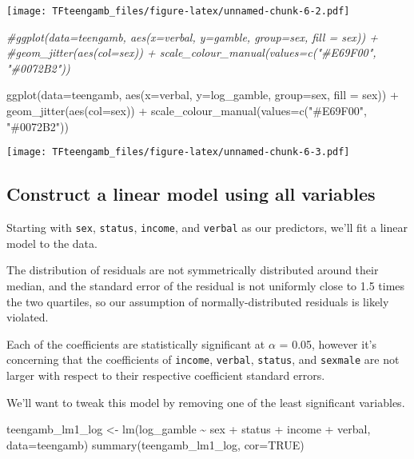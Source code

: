 \documentclass[
]{article}
\newenvironment{Shaded}{\begin{snugshade}}{\end{snugshade}}
\newcommand{\AttributeTok}[1]{\textcolor[rgb]{0.77,0.63,0.00}{#1}}
\newcommand{\CommentTok}[1]{\textcolor[rgb]{0.56,0.35,0.01}{\textit{#1}}}
\newcommand{\ConstantTok}[1]{\textcolor[rgb]{0.00,0.00,0.00}{#1}}
\newcommand{\FunctionTok}[1]{\textcolor[rgb]{0.00,0.00,0.00}{#1}}
\newcommand{\NormalTok}[1]{#1}
\newcommand{\OtherTok}[1]{\textcolor[rgb]{0.56,0.35,0.01}{#1}}
\newcommand{\SpecialCharTok}[1]{\textcolor[rgb]{0.00,0.00,0.00}{#1}}
\newcommand{\StringTok}[1]{\textcolor[rgb]{0.31,0.60,0.02}{#1}}
\begin{document}
\texttt{[image: TFteengamb\_files/figure-latex/unnamed-chunk-6-2.pdf]}

\begin{Shaded}
\begin{Highlighting}[]
\CommentTok{\#ggplot(data=teengamb, aes(x=verbal, y=gamble, group=sex, fill = sex)) + }
  \CommentTok{\#geom\_jitter(aes(col=sex)) + scale\_colour\_manual(values=c("\#E69F00", "\#0072B2"))}

\FunctionTok{ggplot}\NormalTok{(}\AttributeTok{data=}\NormalTok{teengamb, }\FunctionTok{aes}\NormalTok{(}\AttributeTok{x=}\NormalTok{verbal, }\AttributeTok{y=}\NormalTok{log\_gamble, }\AttributeTok{group=}\NormalTok{sex, }\AttributeTok{fill =}\NormalTok{ sex)) }\SpecialCharTok{+} \FunctionTok{geom\_jitter}\NormalTok{(}\FunctionTok{aes}\NormalTok{(}\AttributeTok{col=}\NormalTok{sex)) }\SpecialCharTok{+} \FunctionTok{scale\_colour\_manual}\NormalTok{(}\AttributeTok{values=}\FunctionTok{c}\NormalTok{(}\StringTok{"\#E69F00"}\NormalTok{, }\StringTok{"\#0072B2"}\NormalTok{))}
\end{Highlighting}
\end{Shaded}

\texttt{[image: TFteengamb\_files/figure-latex/unnamed-chunk-6-3.pdf]}

\hypertarget{construct-a-linear-model-using-all-variables}{%
\subsection{Construct a linear model using all
variables}\label{construct-a-linear-model-using-all-variables}}

Starting with \texttt{sex}, \texttt{status}, \texttt{income}, and
\texttt{verbal} as our predictors, we'll fit a linear model to the data.

The distribution of residuals are not symmetrically distributed around
their median, and the standard error of the residual is not uniformly
close to 1.5 times the two quartiles, so our assumption of
normally-distributed residuals is likely violated.

Each of the coefficients are statistically significant at \(\alpha\) =
0.05, however it's concerning that the coefficients of \texttt{income},
\texttt{verbal}, \texttt{status}, and \texttt{sexmale} are not larger
with respect to their respective coefficient standard errors.

We'll want to tweak this model by removing one of the least significant
variables.

\begin{Shaded}
\begin{Highlighting}[]
\NormalTok{teengamb\_lm1\_log }\OtherTok{\textless{}{-}} \FunctionTok{lm}\NormalTok{(log\_gamble }\SpecialCharTok{\textasciitilde{}}\NormalTok{ sex }\SpecialCharTok{+}\NormalTok{ status }\SpecialCharTok{+}\NormalTok{ income }\SpecialCharTok{+}\NormalTok{ verbal, }\AttributeTok{data=}\NormalTok{teengamb)}
\FunctionTok{summary}\NormalTok{(teengamb\_lm1\_log, }\AttributeTok{cor=}\ConstantTok{TRUE}\NormalTok{)}
\end{Highlighting}
\end{Shaded}
\end{document}
